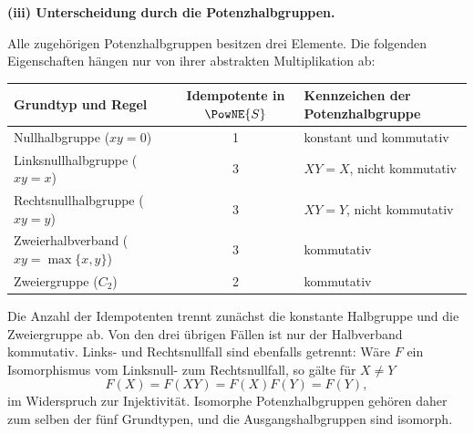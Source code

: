 \par\medskip\noindent\textbf{(iii) Unterscheidung durch die Potenzhalbgruppen.}\par
Alle zugehörigen Potenzhalbgruppen besitzen drei Elemente.  Die folgenden
Eigenschaften hängen nur von ihrer abstrakten Multiplikation ab:
\begin{center}
\small
\begin{tabularx}{\linewidth}{@{}>{\raggedright\arraybackslash}Xc
  >{\raggedright\arraybackslash}X@{}}
\toprule
\textbf{Grundtyp und Regel}&
\textbf{Idempotente in \(\PowNE{S}\)}&
\textbf{Kennzeichen der Potenzhalbgruppe}\\
\midrule
Nullhalbgruppe (\(xy=0\))&1&konstant und kommutativ\\
Linksnullhalbgruppe (\(xy=x\))&3&\(XY=X\), nicht kommutativ\\
Rechtsnullhalbgruppe (\(xy=y\))&3&\(XY=Y\), nicht kommutativ\\
Zweierhalbverband (\(xy=\max\{x,y\}\))&3&kommutativ\\
Zweiergruppe (\(C_2\))&2&kommutativ\\
\bottomrule
\end{tabularx}
\end{center}
Die Anzahl der Idempotenten trennt zunächst die konstante Halbgruppe und die
Zweiergruppe ab.  Von den drei übrigen Fällen ist nur der Halbverband
kommutativ.  Links- und Rechtsnullfall sind ebenfalls getrennt: Wäre
\(F\) ein Isomorphismus vom Linksnull- zum Rechtsnullfall, so gälte für
\(X\neq Y\)
\[
  F(X)=F(XY)=F(X)F(Y)=F(Y),
\]
im Widerspruch zur Injektivität.  Isomorphe Potenzhalbgruppen gehören daher
zum selben der fünf Grundtypen, und die Ausgangshalbgruppen sind isomorph.

